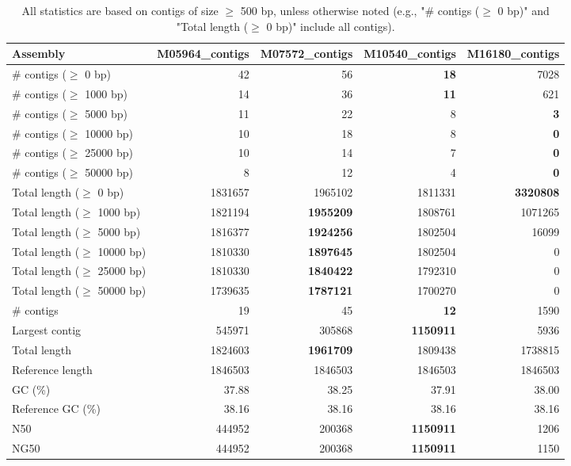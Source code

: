 \documentclass[12pt,a4paper]{article}
\begin{document}
\begin{table}[ht]
\begin{center}
\caption{All statistics are based on contigs of size $\geq$ 500 bp, unless otherwise noted (e.g., "\# contigs ($\geq$ 0 bp)" and "Total length ($\geq$ 0 bp)" include all contigs).}
\begin{tabular}{|l*{4}{|r}|}
\hline
Assembly & M05964\_contigs & M07572\_contigs & M10540\_contigs & M16180\_contigs \\ \hline
\# contigs ($\geq$ 0 bp) & 42 & 56 & {\bf 18} & 7028 \\ \hline
\# contigs ($\geq$ 1000 bp) & 14 & 36 & {\bf 11} & 621 \\ \hline
\# contigs ($\geq$ 5000 bp) & 11 & 22 & 8 & {\bf 3} \\ \hline
\# contigs ($\geq$ 10000 bp) & 10 & 18 & 8 & {\bf 0} \\ \hline
\# contigs ($\geq$ 25000 bp) & 10 & 14 & 7 & {\bf 0} \\ \hline
\# contigs ($\geq$ 50000 bp) & 8 & 12 & 4 & {\bf 0} \\ \hline
Total length ($\geq$ 0 bp) & 1831657 & 1965102 & 1811331 & {\bf 3320808} \\ \hline
Total length ($\geq$ 1000 bp) & 1821194 & {\bf 1955209} & 1808761 & 1071265 \\ \hline
Total length ($\geq$ 5000 bp) & 1816377 & {\bf 1924256} & 1802504 & 16099 \\ \hline
Total length ($\geq$ 10000 bp) & 1810330 & {\bf 1897645} & 1802504 & 0 \\ \hline
Total length ($\geq$ 25000 bp) & 1810330 & {\bf 1840422} & 1792310 & 0 \\ \hline
Total length ($\geq$ 50000 bp) & 1739635 & {\bf 1787121} & 1700270 & 0 \\ \hline
\# contigs & 19 & 45 & {\bf 12} & 1590 \\ \hline
Largest contig & 545971 & 305868 & {\bf 1150911} & 5936 \\ \hline
Total length & 1824603 & {\bf 1961709} & 1809438 & 1738815 \\ \hline
Reference length & 1846503 & 1846503 & 1846503 & 1846503 \\ \hline
GC (\%) & 37.88 & 38.25 & 37.91 & 38.00 \\ \hline
Reference GC (\%) & 38.16 & 38.16 & 38.16 & 38.16 \\ \hline
N50 & 444952 & 200368 & {\bf 1150911} & 1206 \\ \hline
NG50 & 444952 & 200368 & {\bf 1150911} & 1150 \\ \hline

\end{tabular}
\end{center}
\end{table}
\end{document}
